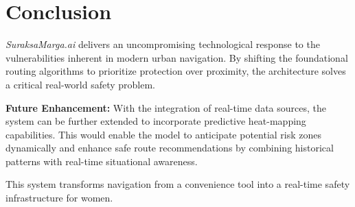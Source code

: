 \section{Conclusion}
\textit{SuraksaMarga.ai} delivers an uncompromising technological response to the vulnerabilities inherent in modern urban navigation. By shifting the foundational routing algorithms to prioritize protection over proximity, the architecture solves a critical real-world safety problem. 

\textbf{Future Enhancement:} With the integration of real-time data sources, the system can be further extended to incorporate predictive heat-mapping capabilities. This would enable the model to anticipate potential risk zones dynamically and enhance safe route recommendations by combining historical patterns with real-time situational awareness.

This system transforms navigation from a convenience tool into a real-time safety infrastructure for women.
